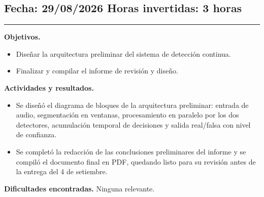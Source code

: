 \documentclass[11pt]{article}
\newenvironment{sesion}[2]{%
  \subsection*{Fecha: #1 \hfill Horas invertidas: #2}
  \vspace{-0.3cm}
  \hrule
  \vspace{0.3cm}
}{\vspace{0.5cm}}
\newcommand{\campo}[1]{\textbf{#1}}
\begin{document}
\begin{sesion}{29/08/2026}{3 horas}
\campo{Objetivos.}
\begin{itemize}
\item Diseñar la arquitectura preliminar del sistema de detección continua.
\item Finalizar y compilar el informe de revisión y diseño.
\end{itemize}
\campo{Actividades y resultados.}
\begin{itemize}
\item Se diseñó el diagrama de bloques de la arquitectura preliminar: entrada de audio, segmentación en ventanas, procesamiento en paralelo por los dos detectores, acumulación temporal de decisiones y salida real/falsa con nivel de confianza.
\item Se completó la redacción de las conclusiones preliminares del informe y se compiló el documento final en PDF, quedando listo para su revisión antes de la entrega del 4 de setiembre.
\end{itemize}
\campo{Dificultades encontradas.} Ninguna relevante.
\end{sesion}
\end{document}
